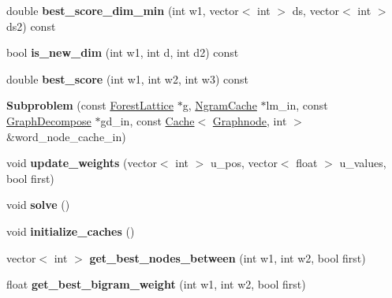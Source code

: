 \begin{DoxyCompactItemize}
\item 
\hypertarget{classSubproblem_a2e2a665cfdb9208f753eef143147d66c}{
double {\bfseries best\_\-score\_\-dim\_\-min} (int w1, vector$<$ int $>$ ds, vector$<$ int $>$ ds2) const }
\label{classSubproblem_a2e2a665cfdb9208f753eef143147d66c}

\item 
\hypertarget{classSubproblem_a2b43a2a68724d8eb624f6d81a7745b70}{
bool {\bfseries is\_\-new\_\-dim} (int w1, int d, int d2) const }
\label{classSubproblem_a2b43a2a68724d8eb624f6d81a7745b70}

\item 
\hypertarget{classSubproblem_a8359ae9db4d8a830d390312bc57eef6f}{
double {\bfseries best\_\-score} (int w1, int w2, int w3) const }
\label{classSubproblem_a8359ae9db4d8a830d390312bc57eef6f}

\item 
\hypertarget{classSubproblem_ae6b6a16e00079ebd5b56acbdfdaf3aab}{
{\bfseries Subproblem} (const \hyperlink{classForestLattice}{ForestLattice} $\ast$g, \hyperlink{classNgramCache}{NgramCache} $\ast$lm\_\-in, const \hyperlink{classGraphDecompose}{GraphDecompose} $\ast$gd\_\-in, const \hyperlink{classCache}{Cache}$<$ \hyperlink{classScarab_1_1Graph_1_1Graphnode}{Graphnode}, int $>$ \&word\_\-node\_\-cache\_\-in)}
\label{classSubproblem_ae6b6a16e00079ebd5b56acbdfdaf3aab}

\item 
\hypertarget{classSubproblem_adf6eb478907ed5c7c9f08a3cfcdfec76}{
void {\bfseries update\_\-weights} (vector$<$ int $>$ u\_\-pos, vector$<$ float $>$ u\_\-values, bool first)}
\label{classSubproblem_adf6eb478907ed5c7c9f08a3cfcdfec76}

\item 
\hypertarget{classSubproblem_a27c807a807f154ea28e7da7692466638}{
void {\bfseries solve} ()}
\label{classSubproblem_a27c807a807f154ea28e7da7692466638}

\item 
\hypertarget{classSubproblem_a8220595977ed219234d36dfadd0dde82}{
void {\bfseries initialize\_\-caches} ()}
\label{classSubproblem_a8220595977ed219234d36dfadd0dde82}

\item 
\hypertarget{classSubproblem_a9c57f3bd41e2788d9f393db8bbbe26ef}{
vector$<$ int $>$ {\bfseries get\_\-best\_\-nodes\_\-between} (int w1, int w2, bool first)}
\label{classSubproblem_a9c57f3bd41e2788d9f393db8bbbe26ef}

\item 
\hypertarget{classSubproblem_a3c426fd46fcacefc561b68f0fc111795}{
float {\bfseries get\_\-best\_\-bigram\_\-weight} (int w1, int w2, bool first)}
\label{classSubproblem_a3c426fd46fcacefc561b68f0fc111795}


\end{DoxyCompactItemize}
